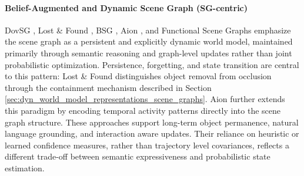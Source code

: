 \paragraph{Belief-Augmented and Dynamic Scene Graph (SG-centric)}
DovSG \cite{yan_dynamic_2025}, Lost \& Found \cite{behrens_lost_2025}, BSG \cite{saucedo_estimating_2025}, Aion \cite{catalano_aion_2025}, and Functional Scene Graphs \cite{zhang_open-vocabulary_2025} emphasize the scene graph as a persistent and explicitly dynamic world model, maintained primarily through semantic reasoning and graph-level updates rather than joint probabilistic optimization.
Persistence, forgetting, and state transition are central to this pattern: Lost \& Found distinguishes object removal from occlusion through the containment mechanism described in Section \ref{sec:dyn_world_model_representations_scene_graphs}.
Aion further extends this paradigm by encoding temporal activity patterns directly into the scene graph structure. 
These approaches  support long-term object permanence, natural language grounding, and interaction aware updates. 
Their reliance on heuristic or learned confidence measures, rather than trajectory level covariances, reflects a different trade-off between semantic expressiveness and probabilistic state estimation.




